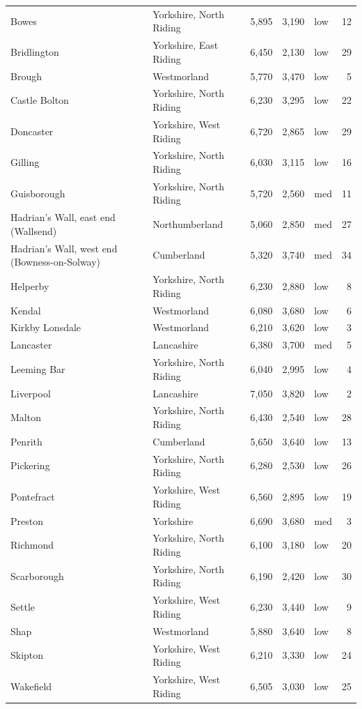 \documentclass[11pt,a4paper]{article}
\begin{document}
{\begin{longtable}{p{5.4cm}p{4.2cm}rrlr}
Bowes & Yorkshire, North Riding & 5,895 & 3,190 & low & 12\\
Bridlington & Yorkshire, East Riding & 6,450 & 2,130 & low & 29\\
Brough & Westmorland & 5,770 & 3,470 & low & 5\\
Castle Bolton & Yorkshire, North Riding & 6,230 & 3,295 & low & 22\\
Doncaster & Yorkshire, West Riding & 6,720 & 2,865 & low & 29\\
Gilling & Yorkshire, North Riding & 6,030 & 3,115 & low & 16\\
Guisborough & Yorkshire, North Riding & 5,720 & 2,560 & med & 11\\
Hadrian's Wall, east end (Wallsend) & Northumberland & 5,060 & 2,850 & med & 27\\
Hadrian's Wall, west end (Bowness-on-Solway) & Cumberland & 5,320 & 3,740 & med & 34\\
Helperby & Yorkshire, North Riding & 6,230 & 2,880 & low & 8\\
Kendal & Westmorland & 6,080 & 3,680 & low & 6\\
Kirkby Lonsdale & Westmorland & 6,210 & 3,620 & low & 3\\
Lancaster & Lancashire & 6,380 & 3,700 & med & 5\\
Leeming Bar & Yorkshire, North Riding & 6,040 & 2,995 & low & 4\\
Liverpool & Lancashire & 7,050 & 3,820 & low & 2\\
Malton & Yorkshire, North Riding & 6,430 & 2,540 & low & 28\\
Penrith & Cumberland & 5,650 & 3,640 & low & 13\\
Pickering & Yorkshire, North Riding & 6,280 & 2,530 & low & 26\\
Pontefract & Yorkshire, West Riding & 6,560 & 2,895 & low & 19\\
Preston & Yorkshire & 6,690 & 3,680 & med & 3\\
Richmond & Yorkshire, North Riding & 6,100 & 3,180 & low & 20\\
Scarborough & Yorkshire, North Riding & 6,190 & 2,420 & low & 30\\
Settle & Yorkshire, West Riding & 6,230 & 3,440 & low & 9\\
Shap & Westmorland & 5,880 & 3,640 & low & 8\\
Skipton & Yorkshire, West Riding & 6,210 & 3,330 & low & 24\\
Wakefield & Yorkshire, West Riding & 6,505 & 3,030 & low & 25\\

\end{longtable}}
\end{document}
